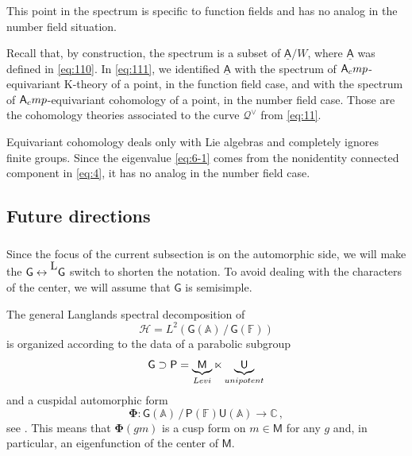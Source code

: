 \documentclass[14pt]{extarticle}
\newcommand{\C}{\mathbb{C}}
\newcommand{\A}{\mathbb{A}}
\newcommand{\F}{\mathbb{F}}
\newcommand{\bA}{\mathsf{A}}
\newcommand{\bG}{\mathsf{G}}
\newcommand{\sP}{\mathsf{P}}
\newcommand{\bM}{\mathsf{M}}
\newcommand{\bU}{\mathsf{U}}
\newcommand{\cQ}{\mathscr{Q}}
\newcommand{\La}{{}^{\raisebox{2pt}{\textup{\tiny\textsf{L}}}}}
\newcommand{\uA}{\underline{\bA}}
\newcommand{\bpi}{\boldsymbol{\pi}}
\newcommand{\bPhi}{\boldsymbol{\Phi}}
\newcommand{\cH}{\mathscr{H}}
\newcommand{\comp}{\textup{cmp}}
\theoremstyle{definition}
\begin{document}
\subsubsection{}

This point in the spectrum is specific to function fields and has no
analog in the number field situation.

Recall that, by construction, the spectrum is a
subset of $\uA/W$, where $\uA$ was defined in \eqref{eq:110}.
In \eqref{eq:111}, we identified $\uA$ with the spectrum of
$\bA_\comp$-equivariant K-theory of a point, in the function field case, and with
the spectrum of $\bA_\comp$-equivariant cohomology of a point, in the
number field case. Those are the cohomology theories
associated to the curve $\cQ^\vee$ from \eqref{eq:11}. 

Equivariant cohomology deals only with Lie algebras and completely 
ignores finite groups. 
Since the eigenvalue \eqref{eq:6-1} comes from the nonidentity connected
component in \eqref{eq:4},  it has no analog in
the number field case. 


  
  \subsection{Future directions}
  \label{s_future}

  \subsubsection{}

Since the focus of the current subsection is on the automorphic side, we
will make the $\bG \leftrightarrow \La \bG$ switch to shorten the
notation. To avoid dealing with  the characters of the center, we
will assume that $\bG$ is semisimple. 


The general Langlands spectral decomposition of
\[
  \cH = L^2\!\left(\bG(\A)\,\big/\,\bG(\F)\right)
\]
is organized according to the data of a parabolic subgroup
\[
  \bG \supset \sP =
  \underbrace{\bM}_{\textup{Levi}} \ltimes
\underbrace{\bU}_{\textup{unipotent}}
\]
and
a cuspidal automorphic form
%
\begin{equation}
\bPhi: \bG(\A)\,\big/\,\sP(\F) \bU(\A) \to \C  \,,  \label{eq:167}
\end{equation}
%
see \cites{Labesse, L}. This means that $\bPhi(g m)$
is a cusp form on $m\in \bM$ for any $g$ and, in
particular, an eigenfunction of the center of  $\bM$.
\end{document}
